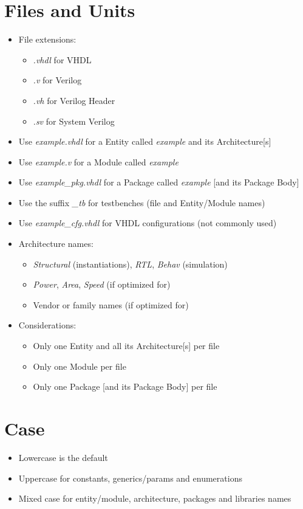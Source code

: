 \documentclass{article}
\begin{document}
\begin{multicols}{3}
  \section*{Files and Units}
    \begin{itemize}
      \item File extensions:
        \begin{itemize}
          \item \textit{.vhdl} for VHDL
          \item \textit{.v} for Verilog
          \item \textit{.vh} for Verilog Header
          \item \textit{.sv} for System Verilog
        \end{itemize}
      \item Use \textit{example.vhdl} for a Entity called \textit{example} and its Architecture[s]
      \item Use \textit{example.v} for a Module called \textit{example}
      \item Use \textit{example\_pkg.vhdl} for a Package called \textit{example}
            [and its Package Body]
      \item Use the suffix \textit{\_tb} for testbenches (file and Entity/Module names)
      \item Use \textit{example\_cfg.vhdl} for VHDL configurations (not commonly used)
      \item Architecture names:
        \begin{itemize}
          \item \textit{Structural} (instantiations), \textit{RTL}, \textit{Behav} (simulation)
          \item \textit{Power}, \textit{Area}, \textit{Speed} (if optimized for)
          \item Vendor or family names (if optimized for)
        \end{itemize}
      \item Considerations:
        \begin{itemize}
          \item Only one Entity and all its Architecture[s] per file
          \item Only one Module per file
          \item Only one Package [and its Package Body] per file
        \end{itemize}
    \end{itemize}
  \section*{Case}
    \begin{itemize}
      \item Lowercase is the default
      \item Uppercase for constants, generics/params and enumerations
      \item Mixed case for entity/module, architecture, packages and libraries names
    \end{itemize}

\end{multicols}
\end{document}
